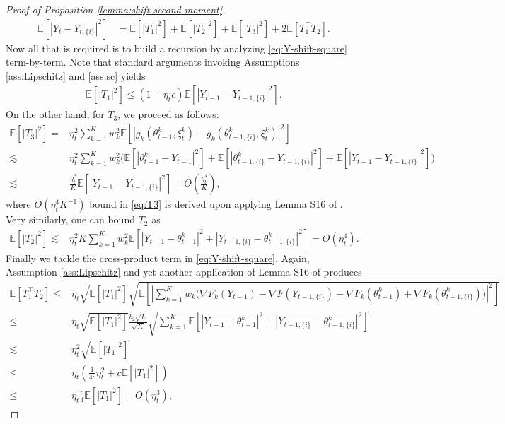 \documentclass[a4paper,11pt]{article}
\numberwithin{equation}{section}
\theoremstyle{plain}
\theoremstyle{remark}
\def\IE{\mathbb{E}}
\newcommand{\shift}[2]{#1_{#2, \{i\}}}
\begin{document}
\begin{proof}[Proof of Proposition \ref{lemma:shift-second-moment}]
\begin{align}
     \IE[|Y_t -\shift{Y}{t}|^2] &= \IE[|T_1|^2] + \IE[|T_2|^2] + \IE[|T_3|^2] + 2\IE[T_1^\top T_2].
 \end{align}
Now all that is required is to build a recursion by analyzing \eqref{eq:Y-shift-square} term-by-term. Note that standard arguments invoking Assumptions \ref{ass:Lipschitz} and \ref{ass:sc} yields 
\begin{align} \label{eq:T1}
    \IE[|T_1|^2] \leq (1-\eta_tc)\IE[|Y_{t-1}-  \shift{Y}{t-1}|^2].
\end{align}
On the other hand, for $T_3$, we proceed as follows:
\begin{align}
    \IE[|T_3|^2] =& \eta_t^2 \sum_{k=1}^K w_k^2 \IE[|g_k(\theta_{t-1}^k, \xi_t^k) -  g_k(\shift{\theta}{t-1}^k, \xi_t^k)|^2] \nonumber\\
    \lesssim  & \eta_t^2 \sum_{k=1}^K w_k^2 \Big(\IE[|\theta_{t-1}^k - Y_{t-1}|^2] +  \IE[|\shift{\theta}{t-1}^k - \shift{Y}{t-1}|^2] + \IE[|Y_{t-1}-\shift{Y}{t-1}|^2] \Big) \nonumber\\
    \lesssim & \frac{\eta_t^2}{K} \IE[|Y_{t-1}-\shift{Y}{t-1}|^2] + O(\frac{\eta_t^4}{K}), \label{eq:T3}
\end{align}
where $O(\eta_t^4 K^{-1})$ bound in \eqref{eq:T3} is derived upon applying Lemma S16 of \cite{songxichen2024}. Very similarly, one can bound $T_2$ as
\begin{align}
    \IE[|T_2|^2] \lesssim & \eta_t^2 K \sum_{k=1}^K w_k^2 \IE[|Y_{t-1} - \theta_{t-1}^k|^2 + |\shift{Y}{t-1} - \shift{\theta}{t-1}^k|^2] = O({\eta_t^4}). \label{eq:T2}
\end{align}
Finally we tackle the cross-product term in \eqref{eq:Y-shift-square}. Again, Assumption \ref{ass:Lipschitz} and yet another application of Lemma S16 of \cite{songxichen2024} produces
\begin{align}
    \IE[T_1^\top T_2] \leq & \eta_t \sqrt{\IE[|T_1|^2]} \sqrt{\IE[|\sum_{k=1}^K w_k \big(\nabla F_k(Y_{t-1}) - \nabla F(\shift{Y}{t-1}) - \nabla F_k(\theta_{t-1}^k) + \nabla F_k(\shift{\theta}{t-1}^k) \big)|^2]} \nonumber\\
    \leq & \eta_t \sqrt{\IE[|T_1|^2]} \frac{b_2 \sqrt{L}}{\sqrt{K}} \sqrt{\sum_{k=1}^K \IE[|Y_{t-1} - \theta_{t-1}^k|^2 + |\shift{Y}{t-1} - \shift{\theta}{t-1}^k|^2] }\nonumber\\
    \lesssim & \eta_t^2 \sqrt{\IE[|T_1|^2]} \nonumber\\
    \leq & \eta_t(\frac{1}{4c} {\eta_t^2} + c \IE[|T_1|^2]) \label{eq:AM-GM} \\
    \leq & \eta_t \frac{c}{4} \IE[|T_1|^2] + O({\eta_t^3}) \label{eq:T1T2},

\end{align}
\end{proof}
\end{document}
